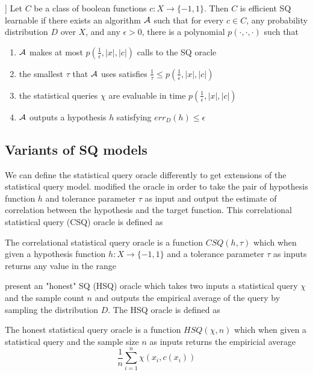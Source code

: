 \begin{definition}]
Let $C$ be a class of boolean functions $c: X \xrightarrow{} \{-1, 1\}$. Then $C$ is efficient SQ learnable if there exists an algorithm $\mathcal{A}$ such that for every $c \in C$, any probability distribution $D$ over $X$, and any $\epsilon > 0$, there is a polynomial $p(\cdot, \cdot, \cdot)$ such that
\begin{enumerate}
    \item $\mathcal{A}$ makes at most $p(\frac{1}{\epsilon}, |x|, |c|)$ calls to the SQ oracle
    \item the smallest $\tau$ that $\mathcal{A}$ uses satisfies $\frac{1}{\tau} \leq p(\frac{1}{\epsilon}, |x|, |c|)$
    \item the statistical queries $\chi$ are evaluable in time $p(\frac{1}{\epsilon}, |x|, |c|)$
    \item $\mathcal{A}$ outputs a hypothesis $h$ satisfying $err_D(h) \leq \epsilon$
\end{enumerate}
    
\end{definition}

\subsection{Variants of SQ models}
We can define the statistical query oracle differently to get extensions of the statistical query model. \citet{bshouty_using_2001} modified the oracle in order to take the pair of hypothesis function $h$ and tolerance parameter $\tau$ as input and output the estimate of correlation between the hypothesis and the target function. This correlational statistical query (CSQ) oracle is defined as

\begin{definition}
The correlational statistical query oracle is a function $CSQ(h, \tau)$ which when given a hypothesis function $h: X \xrightarrow{} \{-1, 1\}$ and a tolerance parameter $\tau$ as inputs returns any value in the range
\begin{equation*}
    [\EE{h(x)c(x)} - \tau, \EE{h(x)c(x)} + \tau]
\end{equation*}
\end{definition}

\cite{yang_learning_2001} present an "honest" SQ (HSQ) oracle which takes two inputs a statistical query $\chi$ and the sample count $n$ and outputs the empirical average of the query by sampling the distribution $D$. The HSQ oracle is defined as

\begin{definition}
The honest statistical query oracle is a function $HSQ(\chi, n)$ which when given a statistical query and the sample size $n$ as inputs returns the empiricial average
\begin{equation*}
    \frac{1}{n} \sum_{i=1}^n \chi(x_i, c(x_i))
\end{equation*}
\end{definition}
